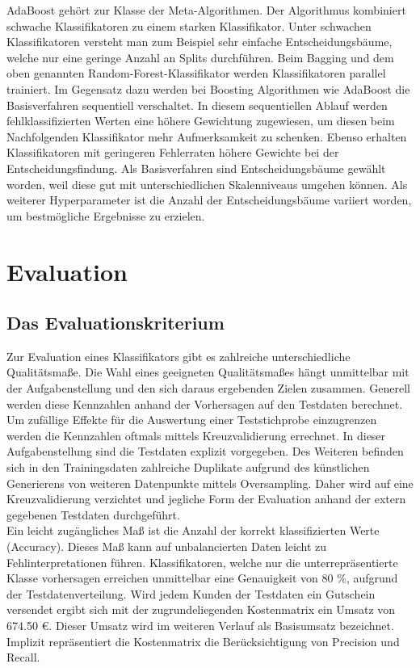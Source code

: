 AdaBoost gehört zur Klasse der Meta-Algorithmen. Der Algorithmus kombiniert schwache Klassifikatoren zu einem starken Klassifikator. Unter schwachen Klassifikatoren versteht man zum Beispiel sehr einfache Entscheidungsbäume, welche nur eine geringe Anzahl an Splits durchführen. Beim Bagging und dem oben genannten Random-Forest-Klassifikator werden Klassifikatoren parallel trainiert. Im Gegensatz dazu werden bei Boosting Algorithmen wie AdaBoost die Basisverfahren sequentiell verschaltet. In diesem sequentiellen Ablauf werden fehlklassifizierten Werten eine höhere Gewichtung zugewiesen, um diesen beim Nachfolgenden Klassifikator mehr Aufmerksamkeit zu schenken. Ebenso erhalten Klassifikatoren mit geringeren Fehlerraten höhere Gewichte bei der Entscheidungsfindung. Als Basisverfahren sind Entscheidungsbäume gewählt worden, weil diese gut mit unterschiedlichen Skalenniveaus umgehen können. Als weiterer Hyperparameter ist die Anzahl der Entscheidungsbäume variiert worden, um bestmögliche Ergebnisse zu erzielen.  

\section{Evaluation}
\label{sec:eval}
\subsection{Das Evaluationskriterium}
Zur Evaluation eines Klassifikators gibt es zahlreiche unterschiedliche Qualitätsmaße. Die Wahl eines geeigneten Qualitätsmaßes hängt unmittelbar mit der Aufgabenstellung und den sich daraus ergebenden Zielen zusammen. Generell werden diese Kennzahlen anhand der Vorhersagen auf den Testdaten berechnet. Um zufällige Effekte für die Auswertung einer Teststichprobe einzugrenzen werden die Kennzahlen oftmals mittels Kreuzvalidierung errechnet. In dieser Aufgabenstellung sind die Testdaten explizit vorgegeben. Des Weiteren befinden sich in den Trainingsdaten zahlreiche Duplikate aufgrund des künstlichen Generierens von weiteren Datenpunkte mittels Oversampling. Daher wird auf eine Kreuzvalidierung verzichtet und jegliche Form der Evaluation anhand der extern gegebenen Testdaten durchgeführt.\\

Ein leicht zugängliches Maß ist die Anzahl der korrekt klassifizierten Werte (Accuracy). Dieses Maß kann auf unbalancierten Daten leicht zu Fehlinterpretationen führen. Klassifikatoren, welche nur die unterrepräsentierte Klasse vorhersagen erreichen unmittelbar eine Genauigkeit von 80 \%, aufgrund der Testdatenverteilung. Wird jedem Kunden der Testdaten ein Gutschein versendet ergibt sich mit der zugrundeliegenden Kostenmatrix ein Umsatz von 674.50 \euro{}. Dieser Umsatz wird im weiteren Verlauf als Basisumsatz bezeichnet. Implizit repräsentiert die Kostenmatrix die Berücksichtigung von Precision und Recall.\\

